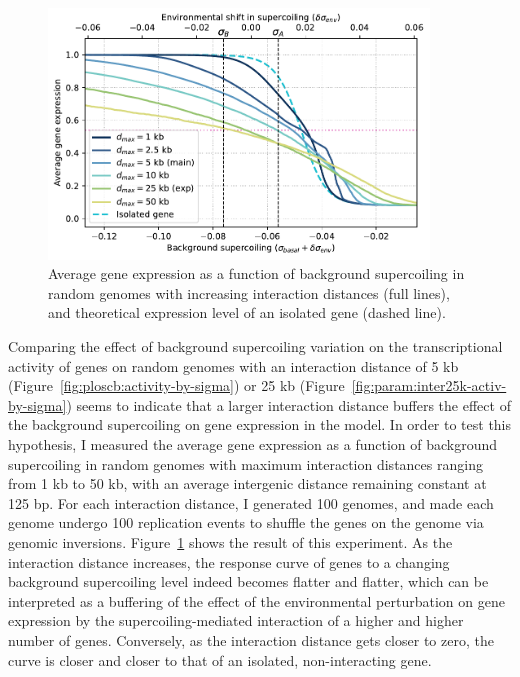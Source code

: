 \begin{figure}[H]
\centering
\includegraphics[width=0.9\textwidth]{param/interaction-25k/random_activ_per_sigma.pdf}
\caption[Average gene expression as a function of background supercoiling, with increasing interaction distances, in random genomes]{Average gene expression as a function of background supercoiling in random genomes with increasing interaction distances (full lines), and theoretical expression level of an isolated gene (dashed line).}
\label{fig:param:inter25k-random-activ-by-sigma}
\end{figure}

Comparing the effect of background supercoiling variation on the transcriptional activity of genes on random genomes with an interaction distance of 5 kb (Figure~\ref{fig:ploscb:activity-by-sigma}) or 25 kb (Figure~\ref{fig:param:inter25k-activ-by-sigma}) seems to indicate that a larger interaction distance buffers the effect of the background supercoiling on gene expression in the model.
In order to test this hypothesis, I measured the average gene expression as a function of background supercoiling in random genomes with maximum interaction distances ranging from 1 kb to 50 kb, with an average intergenic distance remaining constant at 125 bp.
For each interaction distance, I generated 100 genomes, and made each genome undergo 100 replication events to shuffle the genes on the genome via genomic inversions.
Figure~\ref{fig:param:inter25k-random-activ-by-sigma} shows the result of this experiment.
As the interaction distance increases, the response curve of genes to a changing background supercoiling level indeed becomes flatter and flatter, which can be interpreted as a buffering of the effect of the environmental perturbation on gene expression by the supercoiling-mediated interaction of a higher and higher number of  genes.
Conversely, as the interaction distance gets closer to zero, the curve is closer and closer to that of an isolated, non-interacting gene.


